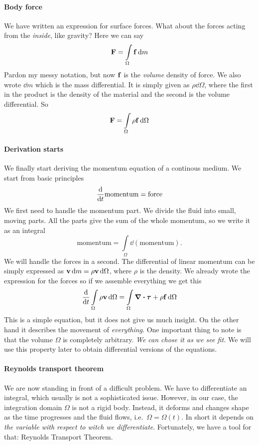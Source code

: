 \documentclass[a4paper]{article}
\begin{document}
\paragraph{Body force}
We have written an expression for surface forces. What about the forces 
acting from the \emph{inside}, like gravity? Here we can say
\[
  \vb{F} = \int\limits_\Omega \vb{f} \dd{m}
\]
Pardon my messy notation, but now \(\vb{f}\) is the \emph{volume} density
of force. We also wrote \(\dd{m}\) which is the mass differential. It is 
simply given as \(\rho\dd{\Omega}\), where the first in the product is the 
density of the material and the second is the volume differential. So
\[
  \vb{F} = \int\limits_\Omega \rho\vb{f} \dd{\Omega}
\]

\paragraph{Derivation starts}
We finally start deriving the momentum equation of a continous medium.
We start from basic principles
\[
  \dv{t}\text{momentum} = {\text{force}}
\]
We first need to handle the momentum part. We divide the fluid into small,
moving parts. All the parts give the sum of the whole momentum, so we write
it as an integral
\[
  \text{momentum} = \int\limits_\Omega \dd{ (\text{momentum})}.
\]
We will handle the forces in a second. The differential of linear momentum 
can be simply expressed as \(\vb{v}\dd{m} = \rho\vb{v} \dd{\Omega}\), where 
\(\rho\) is the density. We already wrote the expression for the forces so 
if we assemble everything we get this
\begin{equation}\label{eq::mom_part}
  \dv{t}\int\limits_\Omega \rho\vb{v} \dd{\Omega} = 
  \int\limits_\Omega  \div\bm{\tau} + \rho\vb{f} \dd{\Omega}
\end{equation}
This is a simple equation, but it does not give us much insight. On the other 
hand it describes the movement of \emph{everything}. One important thing to 
note is that the volume \(\Omega\) is completely arbitrary. \emph{We can 
chose it as we see fit.} We will use this property later to obtain 
differential versions of the equations.

\paragraph{Reynolds transport theorem}
We are now standing in front of a difficult problem. We have to 
differentiate an integral, which usually is not a sophisticated 
issue. However, in our case, the integration domain \(\Omega\)
is not a rigid body. Instead, it deforms and changes shape as the time progresses
and the fluid flows, i.e.\ \(\Omega = \Omega(t)\). In short it depends on 
\emph{the variable with respect to witch we differentiate}.
Fortunately, we have a tool for that: Reynolds Transport Theorem.
\end{document}
